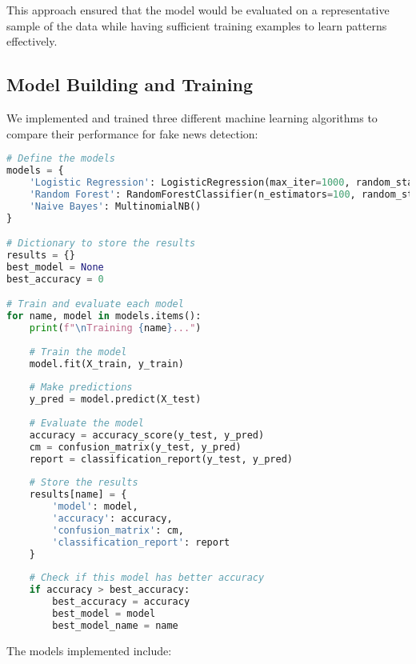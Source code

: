 \documentclass[12pt]{article}
\begin{document}
This approach ensured that the model would be evaluated on a representative sample of the data while having sufficient training examples to learn patterns effectively.

\subsection{Model Building and Training}
We implemented and trained three different machine learning algorithms to compare their performance for fake news detection:

\begin{lstlisting}[language=Python, caption=Model Training Implementation]
# Define the models
models = {
    'Logistic Regression': LogisticRegression(max_iter=1000, random_state=42),
    'Random Forest': RandomForestClassifier(n_estimators=100, random_state=42),
    'Naive Bayes': MultinomialNB()
}

# Dictionary to store the results
results = {}
best_model = None
best_accuracy = 0

# Train and evaluate each model
for name, model in models.items():
    print(f"\nTraining {name}...")
    
    # Train the model
    model.fit(X_train, y_train)
    
    # Make predictions
    y_pred = model.predict(X_test)
    
    # Evaluate the model
    accuracy = accuracy_score(y_test, y_pred)
    cm = confusion_matrix(y_test, y_pred)
    report = classification_report(y_test, y_pred)
    
    # Store the results
    results[name] = {
        'model': model,
        'accuracy': accuracy,
        'confusion_matrix': cm,
        'classification_report': report
    }
    
    # Check if this model has better accuracy
    if accuracy > best_accuracy:
        best_accuracy = accuracy
        best_model = model
        best_model_name = name
\end{lstlisting}

The models implemented include:
\end{document}
